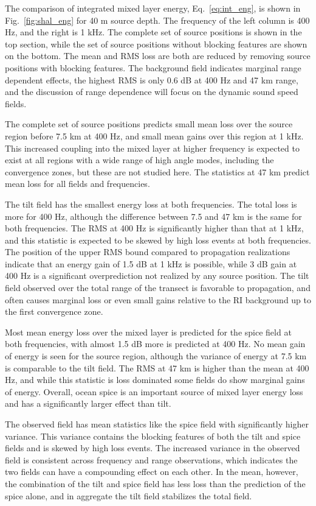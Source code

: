 \documentclass[preprint,NumberedRefs]{JASA}
\begin{document}
The comparison of integrated mixed layer energy, Eq.~\eqref{eq:int_eng}, is shown in Fig.~\ref{fig:shal_eng} for 40 m source depth. The frequency of the left column is 400 Hz, and the right is 1 kHz. The complete set of source positions is shown in the top section, while the set of source positions without blocking features are shown on the bottom. The mean and RMS loss are both are reduced by removing source positions with blocking features. The background field indicates marginal range dependent effects, the highest RMS is only 0.6 dB at 400 Hz and 47 km range, and the discussion of range dependence will focus on the dynamic sound speed fields.

The complete set of source positions predicts small mean loss over the source region before 7.5 km at 400 Hz, and small mean gains over this region at 1 kHz. This increased coupling into the mixed layer at higher frequency is expected to exist at all regions with a wide range of high angle modes, including the convergence zones, but these are not studied here. The statistics at 47 km predict mean loss for all fields and frequencies.

The tilt field has the smallest energy loss at both frequencies. The total loss is more for 400 Hz, although the difference between 7.5 and 47 km is the same for both frequencies. The RMS at 400 Hz is significantly higher than that at 1 kHz, and this statistic is expected to be skewed by high loss events at both frequencies. The position of the upper RMS bound compared to propagation realizations indicate that an energy gain of 1.5 dB at 1 kHz is possible, while 3 dB gain at 400 Hz is a significant overprediction not realized by any source position. The tilt field observed over the total range of the transect is favorable to propagation, and often causes marginal loss or even small gains relative to the RI background up to the first convergence zone.

Most mean energy loss over the mixed layer is predicted for the spice field at both frequencies, with almost 1.5 dB more is predicted at 400 Hz. No mean gain of energy is seen for the source region, although the variance of energy at 7.5 km is comparable to the tilt field. The RMS at 47 km is higher than the mean at 400 Hz, and while this statistic is loss dominated some fields do show marginal gains of energy. Overall, ocean spice is an important source of mixed layer energy loss and has a significantly larger effect than tilt.

The observed field has mean statistics like the spice field with significantly higher variance. This variance contains the blocking features of both the tilt and spice fields and is skewed by high loss events. The increased variance in the observed field is consistent across frequency and range observations, which indicates the two fields can have a compounding effect on each other. In the mean, however, the combination of the tilt and spice field has less loss than the prediction of the spice alone, and in aggregate the tilt field stabilizes the total field.
\end{document}
